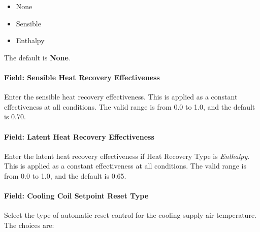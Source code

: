 \begin{itemize}
\item
  None
\item
  Sensible
\item
  Enthalpy
\end{itemize}

The default is \textbf{None}\emph{.}

\paragraph{Field: Sensible Heat Recovery Effectiveness}\label{field-sensible-heat-recovery-effectiveness-5}

Enter the sensible heat recovery effectiveness. This is applied as a constant effectiveness at all conditions. The valid range is from 0.0 to 1.0, and the default is 0.70.

\paragraph{Field: Latent Heat Recovery Effectiveness}\label{field-latent-heat-recovery-effectiveness-5}

Enter the latent heat recovery effectiveness if Heat Recovery Type is \emph{Enthalpy}. This is applied as a constant effectiveness at all conditions. The valid range is from 0.0 to 1.0, and the default is 0.65.

\paragraph{Field: Cooling Coil Setpoint Reset Type}\label{field-cooling-coil-setpoint-reset-type-1}

Select the type of automatic reset control for the cooling supply air temperature. The choices are:

